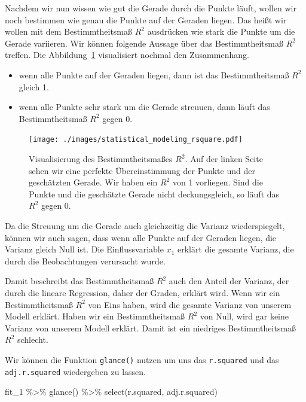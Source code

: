 \documentclass[
  letterpaper,
]{scrbook}
\newenvironment{Shaded}{\begin{snugshade}}{\end{snugshade}}
\newcommand{\FunctionTok}[1]{\textcolor[rgb]{0.28,0.35,0.67}{#1}}
\newcommand{\NormalTok}[1]{\textcolor[rgb]{0.00,0.23,0.31}{#1}}
\newcommand{\SpecialCharTok}[1]{\textcolor[rgb]{0.37,0.37,0.37}{#1}}
\providecommand{\tightlist}{%
  \setlength{\itemsep}{0pt}\setlength{\parskip}{0pt}}\usepackage{longtable,booktabs,array}
\begin{document}
Nachdem wir nun wissen wie gut die Gerade durch die Punkte läuft, wollen
wir noch bestimmen wie genau die Punkte auf der Geraden liegen. Das
heißt wir wollen mit dem Bestimmtheitsmaß \(R^2\) ausdrücken wie stark
die Punkte um die Gerade variieren. Wir können folgende Aussage über das
Bestimmtheitsmaß \(R^2\) treffen. Die Abbildung~\ref{fig-rsquare}
visualisiert nochmal den Zusammenhang.

\begin{itemize}
\tightlist
\item
  wenn alle Punkte auf der Geraden liegen, dann ist das Bestimmtheitsmaß
  \(R^2\) gleich 1.
\item
  wenn alle Punkte sehr stark um die Gerade streuuen, dann läuft das
  Bestimmtheitsmaß \(R^2\) gegen 0.
\end{itemize}

\begin{figure}

{\centering \texttt{[image: ./images/statistical\_modeling\_rsquare.pdf]}

}

\caption{\label{fig-rsquare}Visualisierung des Bestimmtheitsmaßes
\(R^2\). Auf der linken Seite sehen wir eine perfekte Übereinstimmung
der Punkte und der geschätzten Gerade. Wir haben ein \(R^2\) von 1
vorliegen. Sind die Punkte und die geschätzte Gerade nicht
deckungsgleich, so läuft das \(R^2\) gegen 0.}

\end{figure}

Da die Streuung um die Gerade auch gleichzeitig die Varianz
wiederspiegelt, können wir auch sagen, dass wenn alle Punkte auf der
Geraden liegen, die Varianz gleich Null ist. Die Einflussvariable
\(x_1\) erklärt die gesamte Varianz, die durch die Beobachtungen
verursacht wurde.

Damit beschreibt das Bestimmtheitsmaß \(R^2\) auch den Anteil der
Varianz, der durch die lineare Regression, daher der Graden, erklärt
wird. Wenn wir ein Bestimmtheitsmaß \(R^2\) von Eins haben, wird die
gesamte Varianz von unserem Modell erklärt. Haben wir ein
Bestimmtheitsmaß \(R^2\) von Null, wird gar keine Varianz von unserem
Modell erklärt. Damit ist ein niedriges Bestimmtheitsmaß \(R^2\)
schlecht.

Wir können die Funktion \texttt{glance()} nutzen um uns das
\texttt{r.squared} und das \texttt{adj.r.squared} wiedergeben zu lassen.

\begin{Shaded}
\begin{Highlighting}[]
\NormalTok{fit\_1 }\SpecialCharTok{\%\textgreater{}\%} 
  \FunctionTok{glance}\NormalTok{() }\SpecialCharTok{\%\textgreater{}\%} 
  \FunctionTok{select}\NormalTok{(r.squared, adj.r.squared)}
\end{Highlighting}
\end{Shaded}
\end{document}
